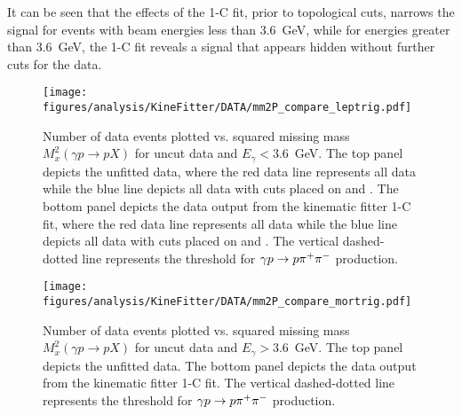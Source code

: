 It can be seen that the effects of the 1-C fit, prior to topological cuts, narrows the \pizT signal for events with beam energies less than 3.6~GeV, while for energies greater than 3.6~GeV, the 1-C fit reveals a signal that appears hidden without further cuts for the data.
\begin{figure}[h!]\begin{center}
\texttt{[image: \\figures/analysis/KineFitter/DATA/mm2P\_compare\_leptrig.pdf]}
\caption[Number of data events plotted vs. missing mass $M_x(\gamma p \to p X)$ for uncut data and $E_\gamma < 3.6$~GeV]{\label{fig:kinfit.effect_lep}Number of data events plotted vs. squared missing mass $M^{2}_x(\gamma p \to p X)$ for uncut data and $E_\gamma < 3.6$~GeV. The top panel depicts the unfitted data, where the red data line represents all data while the blue line depicts all data with cuts placed on  and . The bottom panel depicts the data output from the kinematic fitter 1-C fit, where the red data line represents all data while the blue line depicts all data with cuts placed on  and . The vertical dashed-dotted line represents the threshold for $\gamma p \to p \pi^+\pi^-$ production. }
\end{center}\end{figure}

\begin{figure}[h!]\begin{center}
\texttt{[image: \\figures/analysis/KineFitter/DATA/mm2P\_compare\_mortrig.pdf]}
\caption[Number of data events plotted vs. missing mass $M_x(\gamma p \to p X)$ for uncut data and $E_\gamma > 3.6$~GeV]{\label{fig:kinfit.effect_mor}Number of data events plotted vs. squared missing mass $M^{2}_x(\gamma p \to p X)$ for uncut data and $E_\gamma > 3.6$~GeV. The top panel depicts the unfitted data. The bottom panel depicts the data output from the kinematic fitter 1-C fit. The vertical dashed-dotted line represents the threshold for $\gamma p \to p \pi^+\pi^-$ production.}
\end{center}\end{figure}


